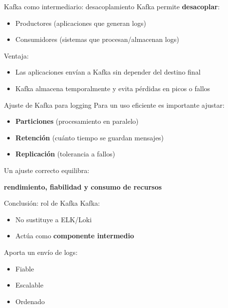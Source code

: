 \documentclass{beamer}
\begin{document}
\begin{frame}{Kafka como intermediario: desacoplamiento}
Kafka permite \textbf{desacoplar}:
\begin{itemize}
    \item Productores (aplicaciones que generan logs)
    \item Consumidores (sistemas que procesan/almacenan logs)
\end{itemize}

\vspace{0.3cm}
Ventaja:
\begin{itemize}
    \item Las aplicaciones envían a Kafka sin depender del destino final
    \item Kafka almacena temporalmente y evita pérdidas en picos o fallos
\end{itemize}
\end{frame}

\begin{frame}{Ajuste de Kafka para logging}
Para un uso eficiente es importante ajustar:
\begin{itemize}
    \item \textbf{Particiones} (procesamiento en paralelo)
    \item \textbf{Retención} (cuánto tiempo se guardan mensajes)
    \item \textbf{Replicación} (tolerancia a fallos)
\end{itemize}

\vspace{0.3cm}
Un ajuste correcto equilibra:
\begin{center}
\textbf{rendimiento, fiabilidad y consumo de recursos}
\end{center}
\end{frame}

\begin{frame}{Conclusión: rol de Kafka}
Kafka:
\begin{itemize}
    \item No sustituye a ELK/Loki
    \item Actúa como \textbf{componente intermedio}
\end{itemize}

\vspace{0.3cm}
Aporta un envío de logs:
\begin{itemize}
    \item Fiable
    \item Escalable
    \item Ordenado
\end{itemize}
\end{frame}
\end{document}
